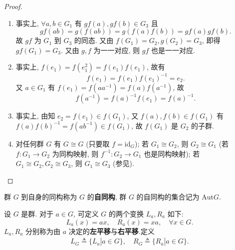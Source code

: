 \documentclass[../../main.tex]{subfiles}%
\begin{document}
\begin{proof}
\begin{enumerate}[(1)]
\item 事实上, \( \forall a,b \in G_1 \) 有 \( gf(a), gf(b) \in G_3 \) 且
\[
gf(ab) = g(f(ab)) = g(f(a)f(b)) = gf(a)gf(b).
\]
故 \( gf \) 为 \( G_1 \) 到 \( G_3 \) 的同态. 又由 \( f(G_1) = G_2, g(G_2) = G_3 \), 即得 \( gf(G_1) = G_3 \). 又由 \( g,f \) 为一一对应, 则 \( gf \) 也是一一对应.

\item 事实上, \( f(e_1) = f(e_1^2) = f(e_1)f(e_1) \), 故有
\[
f(e_1) = f(e_1)f(e_1)^{-1} = e_2.
\]
又 \( a \in G_1 \) 有 \( f(e_1) = f(aa^{-1}) = f(a)f(a^{-1}) \), 故
\[
f(a^{-1}) = f(a)^{-1}f(e_1) = f(a)^{-1}.
\]

\item 事实上, 由知 \( e_2 = f(e_1) \in f(G_1) \), 又 \( f(a),f(b) \in f(G_1) \) 有 \( f(a)f(b)^{-1} = f(ab^{-1}) \in f(G_1) \), 故 \( f(G_1) \) 是 \( G_2 \) 的子群.

\item 对任何群 \( G \) 有 \( G \cong G \) (只要取 \( f = \text{id}_G \)); 若 \( G_1 \cong G_2 \), 则 \( G_2 \cong G_1 \) (若 \( f: G_1 \to G_2 \) 为同构映射, 则 \( f^{-1}: G_2 \to G_1 \) 也是同构映射); 若 \( G_1 \cong G_2, G_2 \cong G_3 \), 则 \( G_1 \cong G_3 \) (参见).
\end{enumerate}

\end{proof}

\begin{definition}
群 \( G \) 到自身的同构称为 \( G \) 的\textbf{自同构}, 群 \( G \) 的自同构的集合记为 \( \text{Aut}G \).
\end{definition}

\begin{definition}
设 \( G \) 是群. 对于 \( a \in G \), 可定义 \( G \) 的两个变换 \( L_a, R_a \) 如下:
\[
L_a(x) = ax, \quad R_a(x) = xa, \quad \forall x \in G.
\]
\( L_a, R_a \) 分别称为由 \( a \) 决定的\textbf{左平移}与\textbf{右平移}.定义
\begin{align*}
L_G\triangleq \{L_a|a\in G\},\quad R_G\triangleq \{R_a|a\in G\}.
\end{align*}
\end{definition}
\end{document}
